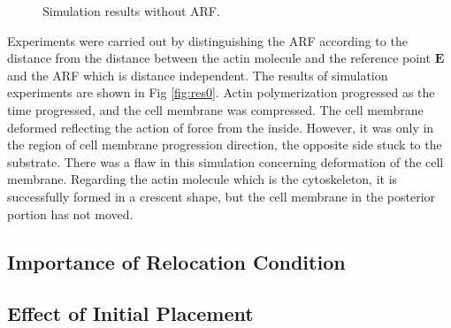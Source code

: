 \documentclass[a4paper,12pt]{book}
\begin{document}
\begin{figure}[h]
{ }%
 \caption{Simulation results without ARF.}
 \label{fig:res2}
\end{figure}

Experiments were carried out by distinguishing the ARF according to the distance from the distance between the actin molecule and the reference point $\bm{E}$ and the ARF which is distance independent. The results of simulation experiments are shown in Fig \ref{fig:res0}. Actin polymerization progressed as the time progressed, and the cell membrane was compressed. The cell membrane deformed reflecting the action of force from the inside. However, it was only in the region of cell membrane progression direction, the opposite side stuck to the substrate. There was a flaw in this simulation concerning deformation of the cell membrane. Regarding the actin molecule which is the cytoskeleton, it is successfully formed in a crescent shape, but the cell membrane in the posterior portion has not moved.

\subsection{Importance of Relocation Condition}

\subsection{Effect of Initial Placement}
\end{document}

